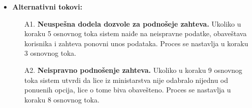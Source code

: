 \documentclass[titlepage]{article}
\begin{document}
\begin{itemize}
\begin{enumerate}
 \end{enumerate}
 \item \textbf{Alternativni tokovi:}
 \begin{itemize}
            \item[A1.] \textbf{Neuspe\v{s}na dodela dozvole za podno\v{s}eje zahteva.} Ukoliko u koraku 5 osnovnog toka sistem naiđe na neispravne podatke, obaveštava korisnika i zahteva ponovni unos podataka. Proces se nastavlja u koraku 3 osnovnog toka.
            \item[A2.] \textbf{Neispravno podno\v{s}enje zahteva.} Ukoliko u koraku 9 osnovnog toka sistem utvrdi da lice iz ministarstva nije odabralo nijednu od ponu\dj{}enih opcija, lice o tome biva obave\v{s}teno. Proces se nastavlja u koraku 8 osnovnog toka. 
        \end{itemize}

\end{itemize}
\end{document}
